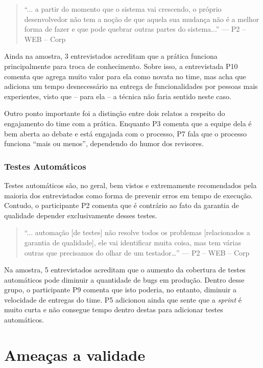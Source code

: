 \begin{quote}
    ``... a partir do momento que o sistema vai crescendo, o próprio desenvolvedor não tem a noção de que aquela sua mudança não é a melhor forma de fazer e que pode quebrar outras partes do sistema...'' --- P2 -- WEB -- Corp
\end{quote}

Ainda na amostra, 3 entrevistados acreditam que a prática funciona principalmente para troca de conhecimento. Sobre isso, a entrevistada P10 comenta que agrega muito valor para ela como novata no time, mas acha que adiciona um tempo desnecessário na entrega de funcionalidades por pessoas mais experientes, visto que -- para ela -- a técnica não faria sentido neste caso.

Outro ponto importante foi a distinção entre dois relatos a respeito do engajamento do time com a prática. Enquanto P3 comenta que a equipe dela é bem aberta ao debate e está engajada com o processo, P7 fala que o processo funciona ``mais ou menos'', dependendo do humor dos revisores.

\subsubsection{Testes Automáticos}

Testes automáticos são, no geral, bem vistos e extremamente recomendados pela maioria dos entrevistados como forma de prevenir erros em tempo de execução. Contudo, o participante P2 comenta que é contrário ao fato da garantia de qualidade depender exclusivamente desses testes.

\begin{quote}
    ``... automação [de testes] não resolve todos os problemas [relacionados a garantia de qualidade], ele vai identificar muita coisa, mas tem várias outras que precisamos do olhar de um testador…'' --- P2 -- WEB -- Corp
\end{quote}

Na amostra, 5 entrevistados acreditam que o aumento da cobertura de testes automáticos pode diminuir a quantidade de bugs em produção. Dentro desse grupo, o participante P9 comenta que isto poderia, no entanto, diminuir a velocidade de entregas do time. P5 adicionou ainda que sente que a \emph{sprint} é muito curta e não consegue tempo dentro destas para adicionar testes automáticos.

\section{Ameaças a validade}

